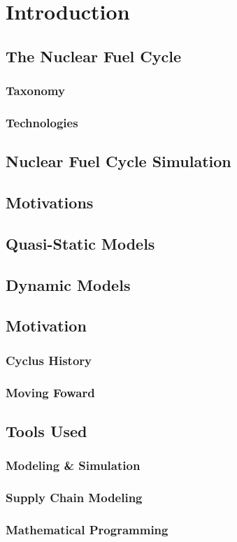 \chapter{Introduction}\label{ch:intro}

\section{The Nuclear Fuel Cycle}

\subsection{Taxonomy}

\subsection{Technologies}

\section{Nuclear Fuel Cycle Simulation}

\section{Motivations}

\section{Quasi-Static Models}

\section{Dynamic Models}

\section{Motivation}

\subsection{Cyclus History}

\subsection{Moving Foward}

\section{Tools Used}

\subsection{Modeling \& Simulation}

\subsection{Supply Chain Modeling}

\subsection{Mathematical Programming}
